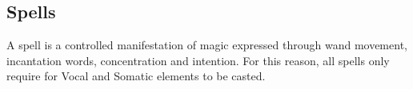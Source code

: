 \pagebreak
\subsection{Spells}
A spell is a controlled manifestation of magic expressed through wand movement, incantation words, concentration and intention. For this reason, all spells only require for Vocal and Somatic elements to be casted. \\












